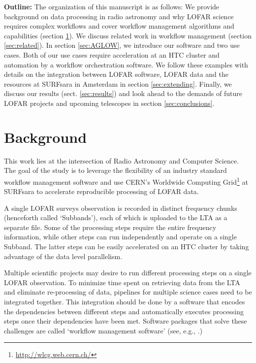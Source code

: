 \textbf{Outline:}
The organization of this manuscript is as follows: We provide background on data processing in radio astronomy and why LOFAR science requires complex workflows and cover workflow management algorithms and capabilities (section \ref{sec:background}). We discuss related work in workflow management (section \ref{sec:related}). In section \ref{sec:AGLOW}, we introduce our software and two use cases. Both of our use cases require acceleration at an HTC cluster and automation by a workflow orchestration software. We follow these examples with details on the integration between LOFAR software, LOFAR data and the resources at SURFsara in Amsterdam in section \ref{sec:extending}. Finally, we discuss our results (sect. \ref{sec:results}) and look ahead to the demands of future LOFAR projects and upcoming telescopes in section \ref{sec:conclusions}. 

\section{Background}\label{sec:background}

This work lies at the intersection of Radio Astronomy and Computer Science. The goal of the study is to leverage the flexibility of an industry standard workflow management software and use CERN's Worldwide Computing Grid\footnote{\url{http://wlcg.web.cern.ch/}} at SURFsara \cite{grid} to accelerate reproducible processing of LOFAR data. 


A single LOFAR surveys observation is recorded in distinct frequency chunks (henceforth called `Subbands'), each of which is uploaded to the LTA as a separate file. Some of the processing steps require the entire frequency information, while other steps can run independently and operate on a single Subband. The latter steps can be easily accelerated on an HTC cluster by taking advantage of the data level parallelism. 

Multiple scientific projects may desire to run different processing steps on a single LOFAR observation. To minimize time spent on retrieving data from the LTA and eliminate re-processing of data, pipelines for multiple science cases need to be integrated together. This integration should be done by a software that encodes the dependencies between different steps and automatically executes processing steps once their dependencies have been met. Software packages that solve these challenges are called `workflow management software' (see, e.g., \cite{workflow1,workflow2,workflow3}.)

